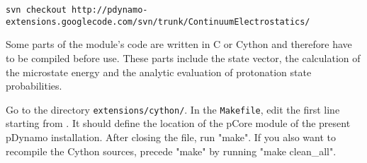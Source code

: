 \documentclass[a4paper,11pt]{article}
\begin{document}
{\footnotesize \begin{lstlisting}
svn checkout http://pdynamo-extensions.googlecode.com/svn/trunk/ContinuumElectrostatics/
\end{lstlisting} }

\bigskip
Some parts of the module's code are written in C or Cython and therefore have to be compiled 
before use. 
%
These parts include the state vector, the calculation of the microstate energy and 
the analytic evaluation of protonation state probabilities.

\bigskip
Go to the directory \texttt{extensions/cython/}.
%
In the \texttt{Makefile}, edit the first line starting from .
%
It should define the location of the pCore module of the present pDynamo installation.
%
After closing the file, run "make".
%
If you also want to recompile the Cython sources, precede "make" by running "make clean\_all". 
%
\end{document}
